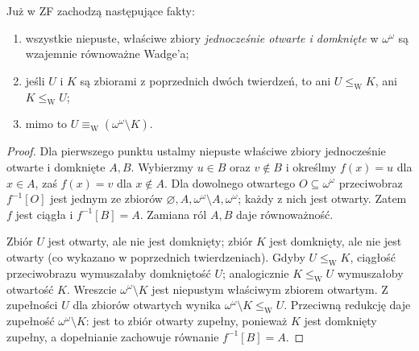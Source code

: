 \begin{wniosek}
\label{cor:wadge-first-degrees}
Już w ZF zachodzą następujące fakty:
\begin{enumerate}
\item wszystkie niepuste, właściwe zbiory \emph{jednocześnie otwarte i domknięte} w $\omega^\omega$ są wzajemnie równoważne Wadge'a;
\item jeśli $U$ i $K$ są zbiorami z poprzednich dwóch twierdzeń, to ani $U\leq_{\mathrm W}K$, ani $K\leq_{\mathrm W}U$;
\item mimo to $U\equiv_{\mathrm W}(\omega^\omega\setminus K)$.
\end{enumerate}
\end{wniosek}
\begin{proof}
Dla pierwszego punktu ustalmy niepuste właściwe zbiory jednocześnie otwarte i domknięte $A,B$.
Wybierzmy $u\in B$ oraz $v\notin B$ i określmy $f(x)=u$ dla $x\in A$, zaś $f(x)=v$ dla $x\notin A$.
Dla dowolnego otwartego $O\subseteq\omega^\omega$ przeciwobraz $f^{-1}[O]$ jest jednym ze zbiorów $\varnothing,A,\omega^\omega\setminus A,\omega^\omega$; każdy z nich jest otwarty. Zatem $f$ jest ciągła i $f^{-1}[B]=A$.
Zamiana ról $A,B$ daje równoważność.

Zbiór $U$ jest otwarty, ale nie jest domknięty; zbiór $K$ jest domknięty, ale nie jest otwarty (co wykazano w poprzednich twierdzeniach).
Gdyby $U\leq_{\mathrm W}K$, ciągłość przeciwobrazu wymuszałaby domkniętość $U$; analogicznie $K\leq_{\mathrm W}U$ wymuszałoby otwartość $K$.
Wreszcie $\omega^\omega\setminus K$ jest niepustym właściwym zbiorem otwartym. Z zupełności $U$ dla zbiorów otwartych wynika $\omega^\omega\setminus K\leq_{\mathrm W}U$.
Przeciwną redukcję daje zupełność $\omega^\omega\setminus K$: jest to zbiór otwarty zupełny, ponieważ $K$ jest domknięty zupełny, a dopełnianie zachowuje równanie $f^{-1}[B]=A$.
\end{proof}

